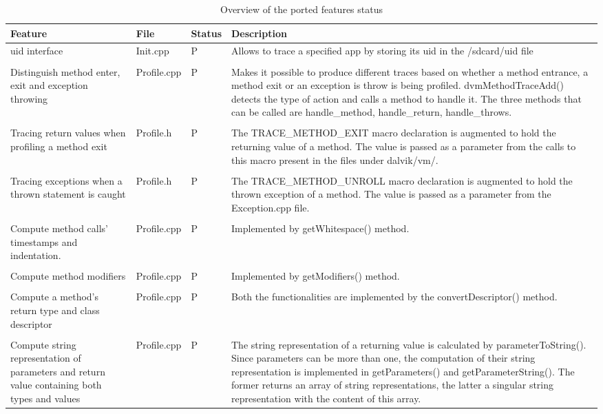 \begin{longtabu}{XllX}
  \caption{Overview of the ported features status}\label{tab:porting_limitations_table}\\
  \hline
  \textbf{Feature} & \textbf{File} & \textbf{Status} & \textbf{Description} \\
  \hline
  \endhead
  \hline
  \endfoot
  uid interface & Init.cpp & P & Allows to trace a specified app by storing its uid in the /sdcard/uid file \\
  & & & \\
  \hline
  Distinguish method enter, exit and exception throwing & Profile.cpp & P & Makes it possible to produce different traces based on whether a method entrance, a method exit or an exception is throw is being profiled. dvmMethodTraceAdd() detects the type of action and calls a method to handle it. The three methods that can be called are handle\_method, handle\_return, handle\_throws.  \\
  & & & \\
  \hline
  Tracing return values when profiling a method exit & Profile.h & P & The TRACE\_METHOD\_EXIT macro declaration is augmented to hold the returning value of a method. The value is passed as a parameter from the calls to this macro present in the files under dalvik/vm/.  \\
  & & & \\
  \hline
  Tracing exceptions when a thrown statement is caught & Profile.h & P & The TRACE\_METHOD\_UNROLL macro declaration is augmented to hold the thrown exception of a method. The value is passed as a parameter from the Exception.cpp file.  \\
  & & & \\
  \hline
  Compute method calls' timestamps and indentation. & Profile.cpp & P & Implemented by getWhitespace() method.  \\
  & & & \\
  \hline
  Compute method modifiers & Profile.cpp & P & Implemented by getModifiers() method.  \\
  & & & \\
  \hline
  Compute a method's return type and class descriptor & Profile.cpp & P & Both the functionalities are implemented by the convertDescriptor() method.  \\
  & & & \\
  \hline
  Compute string representation of parameters and return value containing both types and values & Profile.cpp & P & The string representation of a returning value is calculated by parameterToString(). Since parameters can be more than one, the computation of their string representation is implemented in getParameters() and getParameterString(). The former returns an array of string representations, the latter a singular string representation with the content of this array. \\

\end{longtabu}
